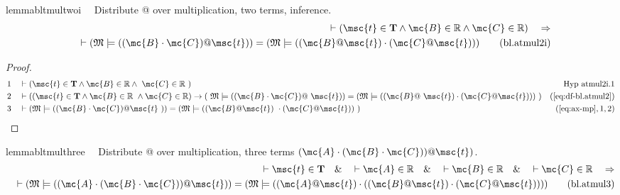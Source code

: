 \begin{restatable}{lemma}{bltmultwoi}~~ Distribute @ over multiplication, two
terms, inference.
\begin{align}
\vdash ( \msc{t} \in \mathbf{T} \wedge \mc{B} \in \mathbb{R} \wedge \mc{C} \in
    \mathbb{R} )\quad\Rightarrow \notag \\ 
	\quad \vdash ( \mathfrak{M} \models ( ( \mc{B}
    \cdot \mc{C} ) @ \msc{t} ) ) = ( \mathfrak{M} \models ( ( \mc{B} @ \msc{t}
    ) \cdot ( \mc{C} @ \msc{t} ) ) )\label{eq:bl.atmul2i}\tag{bl.atmul2i}
\end{align}
\end{restatable}

\begin{proof}
\begin{align}
  1 &&  & \vdash ( \msc{t} \in \mathbf{T} \wedge \mc{B} \in \mathbb{R} \wedge
     ~\mc{C} \in \mathbb{R}
     ~)&\text{Hyp~atmul2i.1}\notag%
  \\ 2 &&  & \vdash ( ( \msc{t} \in \mathbf{T} \wedge \mc{B} \in \mathbb{R}
     ~\wedge \mc{C} \in \mathbb{R} ) \rightarrow (
     ~\mathfrak{M} \models ( ( \mc{B} \cdot \mc{C} ) @
     ~\msc{t} ) ) = ( \mathfrak{M} \models ( ( \mc{B} @
     ~\msc{t} ) \cdot ( \mc{C} @ \msc{t} ) ) )
     ~)&(\mbox{\ref{eq:df-bl.atmul2}})\notag
  \\ 3 &&  & \vdash ( \mathfrak{M} \models ( ( \mc{B} \cdot \mc{C} ) @ \msc{t}
     ~) ) = ( \mathfrak{M} \models ( ( \mc{B} @ \msc{t} )
     ~\cdot ( \mc{C} @ \msc{t} ) )
     ~)&(\mbox{\ref{eq:ax-mp}},1,2)\notag
\end{align}
\end{proof}

\begin{restatable}{lemma}{bltmulthree}~~ Distribute @ over multiplication, three
terms $( \mc{A} \cdot ( \mc{B} \cdot \mc{C} ) ) @ \msc{t} )$.
\begin{align}
\vdash \msc{t} \in \mathbf{T}\quad\&\quad \vdash \mc{A} \in
    \mathbb{R}\quad\&\quad \vdash \mc{B} \in \mathbb{R}\quad\&\quad \vdash
    \mc{C} \in \mathbb{R}\quad\Rightarrow \notag \\ 
	\quad \vdash ( \mathfrak{M} \models (
    ( \mc{A} \cdot ( \mc{B} \cdot \mc{C} ) ) @ \msc{t} ) ) = ( \mathfrak{M}
    \models ( ( \mc{A} @ \msc{t} ) \cdot ( ( \mc{B} @ \msc{t} ) \cdot ( \mc{C}
    @ \msc{t} ) ) ) )\label{eq:bl.atmul3}\tag{bl.atmul3}
\end{align}
\end{restatable}

